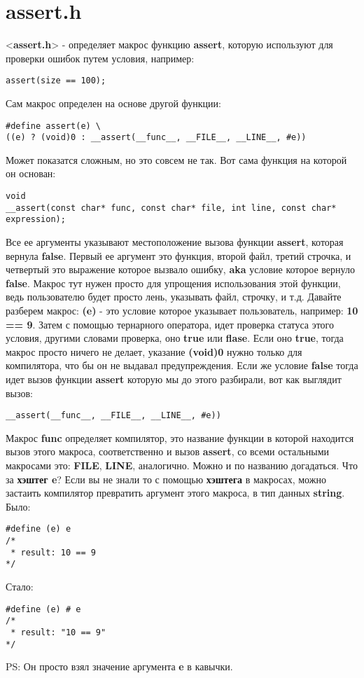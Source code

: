 \documentclass[12pt, letterpaper]{article}
\begin{document}
\section{assert.h}
<\textbf{assert.h}> - определяет макрос функцию \textbf{assert}, которую используют для проверки ошибок
путем условия, например:
\begin{lstlisting}
assert(size == 100);
\end{lstlisting}
Сам макрос определен на основе другой функции:
\begin{lstlisting}
#define assert(e) \
((e) ? (void)0 : __assert(__func__, __FILE__, __LINE__, #e))
\end{lstlisting}
Может показатся сложным, но это совсем не так. Вот сама функция на которой он основан:
\begin{lstlisting}
void
__assert(const char* func, const char* file, int line, const char* expression);
\end{lstlisting}
Все ее аргументы указывают местоположение вызова функции \textbf{assert}, которая вернула \textbf{false}.
Первый ее аргумент это функция, второй файл,
третий строчка, и четвертый это выражение которое вызвало ошибку, \textbf{aka} условие которое вернуло \textbf{false}.
\newline
\newline
Макрос тут нужен просто для упрощения использования этой функции, ведь пользователю будет просто лень, указывать файл, строчку, и т.д.
\newline
\newline
Давайте разберем макрос: \textbf{(e)} - это условие которое указывает пользователь, например: \textbf{10 == 9}.
Затем с помощью тернарного оператора, идет проверка статуса этого условия, другими словами проверка, оно \textbf{true} или \textbf{flase}.
Если оно \textbf{true}, тогда макрос просто ничего не делает, указание \textbf{(void)0} нужно только для компилятора, что бы он не выдавал
предупреждения.
Если же условие \textbf{false} тогда идет вызов функции \textbf{assert} которую мы до этого разбирали, вот как выглядит вызов:
\begin{lstlisting}
__assert(__func__, __FILE__, __LINE__, #e))
\end{lstlisting}
Макрос \textbf{func} определяет компилятор, это название функции в которой находится вызов этого макроса,
соответственно и вызов \textbf{assert}, со всеми остальными макросами это: \textbf{FILE}, \textbf{LINE}, аналогично.
Можно и по названию догадаться.
\newline
\newline
Что за \textbf{хэштег e}? Если вы не знали то с помощью \textbf{хэштега}
в макросах, можно застаить компилятор превратить аргумент этого макроса, в тип данных \textbf{string}.
\newline
\newline
Было:
\begin{lstlisting}
#define (e) e
/*
 * result: 10 == 9
*/
\end{lstlisting}
Стало:
\begin{lstlisting}
#define (e) # e
/*
 * result: "10 == 9"
*/
\end{lstlisting}
PS: Он просто взял значение аргумента \textbf{e} в кавычки.
\end{document}
